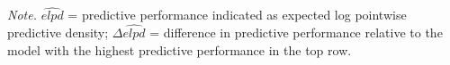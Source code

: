 \begin{appendix}
\begin{table}[tbp]
\begin{center}
\begin{threeparttable}
\begin{tablenotes}[para]
\normalsize{\textit{Note.} $\widehat{elpd}$ = predictive performance indicated as expected log pointwise predictive density; $\Delta\widehat{elpd}$ = difference in predictive performance relative to the model with the highest predictive performance in the top row.}
\end{tablenotes}

\end{threeparttable}
\end{center}

\end{table}
\end{appendix}
